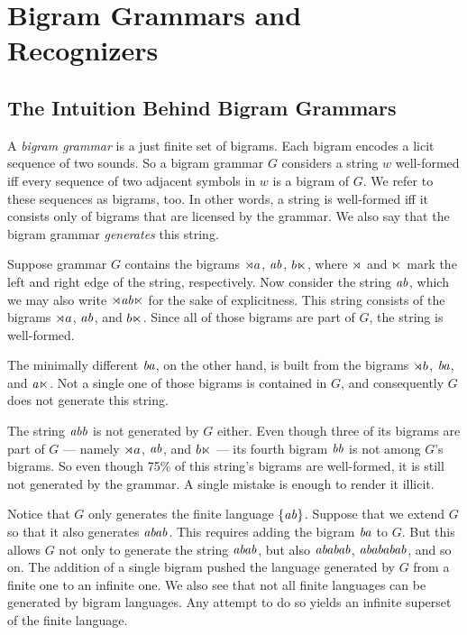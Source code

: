 \section{Bigram Grammars and Recognizers}

\subsection{The Intuition Behind Bigram Grammars}
A \emph{bigram grammar} is a just finite set of bigrams.
Each bigram encodes a licit sequence of two sounds.
So a bigram grammar $G$ considers a string $w$ well-formed iff every sequence of two adjacent symbols in $w$ is a bigram of $G$.
We refer to these sequences as bigrams, too.
In other words, a string is well-formed iff it consists only of bigrams that are licensed by the grammar.
We also say that the bigram grammar \emph{generates} this string.

\begin{examplebox}
    \label{ex:SL_BigramGrammar}%
    Suppose grammar $G$ contains the bigrams $\rtimes a$, $\mathit{ab}$, $b \ltimes$, where $\rtimes$ and $\ltimes$ mark the left and right edge of the string, respectively.
    Now consider the string $\mathit{ab}$, which we may also write $\rtimes \mathit{ab} \ltimes$ for the sake of explicitness.
    This string consists of the bigrams $\rtimes a$, $\mathit{ab}$, and $b \ltimes$.
    Since all of those bigrams are part of $G$, the string is well-formed. 

    The minimally different $\mathit{ba}$, on the other hand, is built from the bigrams $\rtimes b$, $\mathit{ba}$, and $\mathit{a \ltimes}$.
    Not a single one of those bigrams is contained in $G$, and consequently $G$ does not generate this string.

    The string $\mathit{abb}$ is not generated by $G$ either.
    Even though three of its bigrams are part of $G$ --- namely $\rtimes a$, $\mathit{ab}$, and $b \ltimes$ --- its fourth bigram $\mathit{bb}$ is not among $G$'s bigrams.
    So even though 75\% of this string's bigrams are well-formed, it is still not generated by the grammar.
    A single mistake is enough to render it illicit.

    Notice that $G$ only generates the finite language $\left \{ \mathit{ab} \right \}$.
    Suppose that we extend $G$ so that it also generates $\mathit{abab}$.
    This requires adding the bigram $\mathit{ba}$ to $G$.
    But this allows $G$ not only to generate the string $\mathit{abab}$, but also $\mathit{ababab}$, $\mathit{abababab}$, and so on.
    The addition of a single bigram pushed the language generated by $G$ from a finite one to an infinite one.
    We also see that not all finite languages can be generated by bigram languages.
    Any attempt to do so yields an infinite superset of the finite language.
\end{examplebox}

